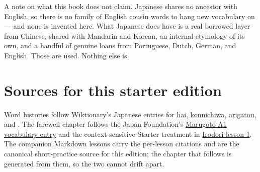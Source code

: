 \documentclass[11pt,twoside]{book}
\begin{document}
A note on what this book does not claim. Japanese shares no ancestor with
English, so there is no family of English cousin words to hang new vocabulary on
--- and none is invented here. What Japanese does have is a real borrowed layer
from Chinese, shared with Mandarin and Korean, an internal etymology of its own,
and a handful of genuine loans from Portuguese, Dutch, German, and English. Those
are used. Nothing else is.

\tableofcontents

\mainmatter

















\backmatter





\chapter*{Sources for this starter edition}

Word histories follow Wiktionary's Japanese entries for
\href{https://en.wiktionary.org/wiki/\%E3\%81\%AF\%E3\%81\%84}{hai},
\href{https://en.wiktionary.org/wiki/\%E4\%BB\%8A\%E6\%97\%A5\%E3\%81\%AF}{konnichiwa},
\href{https://en.wiktionary.org/wiki/\%E6\%9C\%89\%E9\%9B\%A3\%E3\%81\%86}{arigatou},
and
\href{https://en.wiktionary.org/wiki/\%E3\%82\%B3\%E3\%83\%BC\%E3\%83\%92\%E3\%83\%BC}{}.
The farewell chapter follows the Japan Foundation's
\href{https://words.marugotoweb.jp/search_detail.php?cd=1\&id=435\&lang=en\&lv=A1\&source=cando}{Marugoto A1 vocabulary entry}
and the context-sensitive Starter treatment in
\href{https://www.irodori.jpf.go.jp/assets/data/starter/pdf/X_L01_au.pdf}{Irodori lesson 1}.
The companion Markdown lessons carry the per-lesson citations and are the
canonical short-practice source for this edition; the chapter that follows is
generated from them, so the two cannot drift apart.


\end{document}
